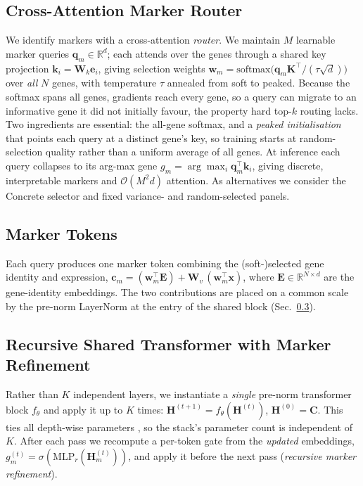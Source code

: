 \documentclass[letterpaper]{article}
\begin{document}
\subsection{Cross-Attention Marker Router}
We identify markers with a cross-attention \emph{router}. We maintain $M$ learnable
marker queries $\mathbf{q}_m \in \mathbb{R}^{d}$; each attends over the genes through a
shared key projection $\mathbf{k}_i = \mathbf{W}_k \mathbf{e}_i$, giving selection
weights
$\mathbf{w}_m = \mathrm{softmax}\big(\mathbf{q}_m \mathbf{K}^{\top}/(\tau\sqrt{d})\big)$
over \emph{all} $N$ genes, with temperature $\tau$ annealed from soft to peaked.
Because the softmax spans all genes, gradients reach every gene, so a query can
migrate to an informative gene it did not initially favour, the property hard top-$k$
routing lacks. Two ingredients are essential: the all-gene softmax, and a
\emph{peaked initialisation} that points each query at a distinct gene's key, so
training starts at random-selection quality rather than a uniform average of all
genes. At inference each query collapses to its arg-max gene
$g_m = \arg\max_i \mathbf{q}_m^{\top}\mathbf{k}_i$, giving discrete, interpretable
markers and $\mathcal{O}(M^2 d)$ attention. As alternatives we consider the Concrete
selector \cite{balin2019concrete,jang2017categorical} and fixed variance- and
random-selected panels.

\subsection{Marker Tokens}
Each query produces one marker token combining the (soft-)selected gene identity and
expression,
$\mathbf{c}_m = (\mathbf{w}_m^{\top}\mathbf{E}) + \mathbf{W}_v\,(\mathbf{w}_m^{\top}\mathbf{x})$,
where $\mathbf{E}\in\mathbb{R}^{N\times d}$ are the gene-identity embeddings. The two
contributions are placed on a common scale by the pre-norm LayerNorm at the entry of
the shared block (Sec.~\ref{sec:rec}).

\subsection{Recursive Shared Transformer with Marker Refinement}
\label{sec:rec}
Rather than $K$ independent layers, we instantiate a \emph{single} pre-norm
transformer block $f_\theta$ and apply it up to $K$ times:
$\mathbf{H}^{(t+1)} = f_\theta(\mathbf{H}^{(t)})$, $\mathbf{H}^{(0)} = \mathbf{C}$.
This ties all depth-wise parameters \cite{dehghani2019universal,lan2020albert,%
bae2025mixture}, so the stack's parameter count is independent of $K$. After each
pass we recompute a per-token gate from the \emph{updated} embeddings,
$g^{(t)}_m = \sigma(\mathrm{MLP}_r(\mathbf{H}^{(t)}_m))$, and apply it before the next
pass (\emph{recursive marker refinement}).
\end{document}
